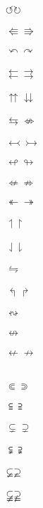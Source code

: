 \documentclass{article}
\begin{document}
$\circlearrowleft \circlearrowright$\\\\
$\Lleftarrow \Rrightarrow$\\\\
$\curvearrowleft \curvearrowright$\\\\
$\leftleftarrows \rightrightarrows$\\\\
$\upuparrows \downdownarrows$\\\\
$\leftrightarrows \nLeftrightarrow$\\\\
$\leftarrowtail \rightarrowtail$\\\\
$\looparrowleft \looparrowright$\\\\
$\nLeftarrow \nRightarrow$\\\\
$\twoheadleftarrow \twoheadrightarrow$\\\\
$\upharpoonleft \upharpoonright$\\\\
$\downharpoonleft \downharpoonright$\\\\
$\leftrightharpoons$\\\\
$\Lsh \Rsh$\\\\
$\leftrightsquigarrow$\\\\
$\nleftrightarrow$\\\\
$\nleftarrow \nrightarrow$\\\\
\\
$\Subset \Supset$\\\\
$\subseteqq \supseteqq$\\\\
$\subsetneq \supsetneq$\\\\
$\subsetneqq \supsetneqq$\\\\
$\varsubsetneq \varsupsetneq$\\\\       
$\varsubsetneqq \varsupsetneqq$\\\\
\end{document}
